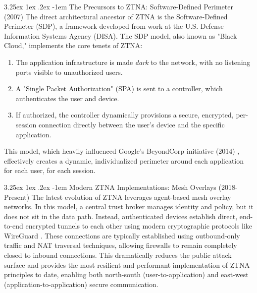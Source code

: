 \documentclass[12pt, a4paper, reqno, oneside]{book}
\makeatletter
\renewcommand\paragraph{\@startsection{paragraph}{5}{\z@}%
  {3.25ex \@plus1ex \@minus.2ex}%
  {-1em}%
  {\normalfont\normalsize\bfseries}}
\makeatother
\begin{document}
\paragraph{The Precursors to ZTNA: Software-Defined Perimeter (2007)}
The direct architectural ancestor of ZTNA is the Software-Defined Perimeter (SDP), a framework developed from work at the U.S. Defense Information Systems Agency (DISA). The SDP model, also known as "Black Cloud," implements the core tenets of ZTNA:
\begin{enumerate}
    \item The application infrastructure is made \textit{dark} to the network, with no listening ports visible to unauthorized users.
    \item A "Single Packet Authorization" (SPA) is sent to a controller, which authenticates the user and device.
    \item If authorized, the controller dynamically provisions a secure, encrypted, per-session connection directly between the user's device and the specific application.
\end{enumerate}
This model, which heavily influenced Google's BeyondCorp initiative (2014) \cite{BeyondCorp2014}, effectively creates a dynamic, individualized perimeter around each application for each user, for each session.

\paragraph{Modern ZTNA Implementations: Mesh Overlays (2018-Present)}
The latest evolution of ZTNA leverages agent-based mesh overlay networks. In this model, a central trust broker manages identity and policy, but it does not sit in the data path. Instead, authenticated devices establish direct, end-to-end encrypted tunnels to each other using modern cryptographic protocols like WireGuard \cite{donenfeld2017wireguard}. These connections are typically established using outbound-only traffic and NAT traversal techniques, allowing firewalls to remain completely closed to inbound connections. This dramatically reduces the public attack surface and provides the most resilient and performant implementation of ZTNA principles to date, enabling both north-south (user-to-application) and east-west (application-to-application) secure communication.




\end{document}
